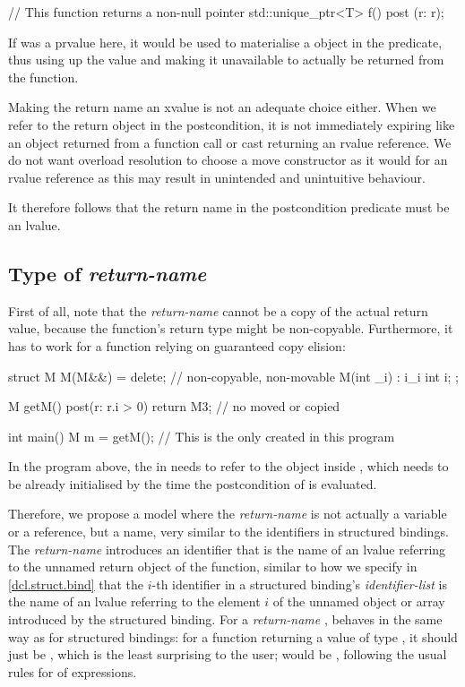 \begin{codeblock}
// This function returns a non-null pointer
std::unique_ptr<T> f()
  post (r: r);
\end{codeblock}

If  was a prvalue here, it would be used to materialise a  object in the predicate, thus using up the value and making it unavailable to actually be returned from the function.

Making the return name an xvalue is not an adequate choice either. When we refer to the return object in the postcondition, it is not immediately expiring like an object returned from a function call or cast returning an rvalue reference.  We do not want overload resolution to choose a move constructor as it would for an rvalue reference as this may result in unintended and unintuitive behaviour.

It therefore follows that the return name in the postcondition predicate must be an lvalue.

\subsection{Type of \emph{return-name}}

First of all, note that the \emph{return-name} cannot be a copy of the actual return value, because the function's return type might be non-copyable. Furthermore, it has to work for a function relying on guaranteed copy elision:

\begin{codeblock}
struct M {
  M(M&&) = delete; // non-copyable, non-movable
  M(int _i) : i{_i}  {}
  int i;
};

M getM()
  post(r: r.i > 0)
{
  return M{3}; // no  moved or copied
}

int main() {
  M m = getM(); // This is the only  created in this program
} 
\end{codeblock}

In the program above, the  in  needs to refer to the object  inside , which needs to be already initialised by the time the postcondition of  is evaluated.

Therefore, we propose a model where the \emph{return-name} is not actually a variable or a reference, but a name, very similar to the identifiers in structured bindings. The \emph{return-name} introduces an identifier that is the name of an lvalue referring to the unnamed return object of the function, similar to how we specify in \href{https://eel.is/c++draft/dcl.struct.bind}{[dcl.struct.bind]} that the $i$-th identifier in a structured binding's \emph{identifier-list} is the name of an lvalue referring to the element $i$ of the unnamed object or array introduced by the structured binding. For a \emph{return-name} ,  behaves in the same way as for structured bindings: for a function returning a value of type , it should just be , which is the least surprising to the user;  would be , following the usual rules for  of expressions.

